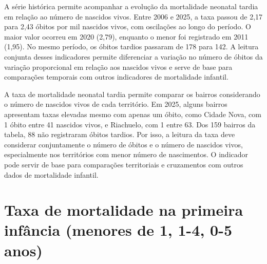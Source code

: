 
A série histórica permite acompanhar a evolução da mortalidade neonatal tardia em relação ao número de nascidos vivos. Entre 2006 e 2025, a taxa passou de 2,17 para 2,43 óbitos por mil nascidos vivos, com oscilações ao longo do período. O maior valor ocorreu em 2020 (2,79), enquanto o menor foi registrado em 2011 (1,95). No mesmo período, os óbitos tardios passaram de 178 para 142. A leitura conjunta desses indicadores permite diferenciar a variação no número de óbitos da variação proporcional em relação aos nascidos vivos e serve de base para comparações temporais com outros indicadores de mortalidade infantil.


A taxa de mortalidade neonatal tardia permite comparar os bairros considerando o número de nascidos vivos de cada território. Em 2025, alguns bairros apresentam taxas elevadas mesmo com apenas um óbito, como Cidade Nova, com 1 óbito entre 41 nascidos vivos, e Riachuelo, com 1 entre 63. Dos 159 bairros da tabela, 88 não registraram óbitos tardios. Por isso, a leitura da taxa deve considerar conjuntamente o número de óbitos e o número de nascidos vivos, especialmente nos territórios com menor número de nascimentos. O indicador pode servir de base para comparações territoriais e cruzamentos com outros dados de mortalidade infantil.


\section{Taxa de mortalidade na primeira infância (menores de 1, 1-4, 0-5 anos)}


